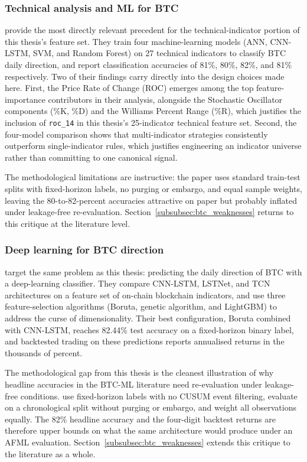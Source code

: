 \documentclass[12pt,a4paper,oneside]{article}
\begin{document}
\subsubsection{Technical analysis and ML for BTC}\label{subsubsec:btc_ta}

\citet{mate_confluence_2024} provide the most directly relevant precedent for the technical-indicator portion of this thesis's feature set. They train four machine-learning models (ANN, CNN-LSTM, SVM, and Random Forest) on 27 technical indicators to classify BTC daily direction, and report classification accuracies of 81\%, 80\%, 82\%, and 81\% respectively. Two of their findings carry directly into the design choices made here. First, the Price Rate of Change (ROC) emerges among the top feature-importance contributors in their analysis, alongside the Stochastic Oscillator components (\%K, \%D) and the Williams Percent Range (\%R), which justifies the inclusion of \texttt{roc\_14} in this thesis's 25-indicator technical feature set. Second, the four-model comparison shows that multi-indicator strategies consistently outperform single-indicator rules, which justifies engineering an indicator universe rather than committing to one canonical signal.

The methodological limitations are instructive: the paper uses standard train-test splits with fixed-horizon labels, no purging or embargo, and equal sample weights, leaving the 80-to-82-percent accuracies attractive on paper but probably inflated under leakage-free re-evaluation. Section~\ref{subsubsec:btc_weaknesses} returns to this critique at the literature level.


\subsubsection{Deep learning for BTC direction}\label{subsubsec:btc_dl}

\citet{omole_enke_2024} target the same problem as this thesis: predicting the daily direction of BTC with a deep-learning classifier. They compare CNN-LSTM, LSTNet, and TCN architectures on a feature set of on-chain blockchain indicators, and use three feature-selection algorithms (Boruta, genetic algorithm, and LightGBM) to address the curse of dimensionality. Their best configuration, Boruta combined with CNN-LSTM, reaches 82.44\% test accuracy on a fixed-horizon binary label, and backtested trading on these predictions reports annualised returns in the thousands of percent.

The methodological gap from this thesis is the cleanest illustration of why headline accuracies in the BTC-ML literature need re-evaluation under leakage-free conditions. \citet{omole_enke_2024} use fixed-horizon labels with no CUSUM event filtering, evaluate on a chronological split without purging or embargo, and weight all observations equally. The 82\% headline accuracy and the four-digit backtest returns are therefore upper bounds on what the same architecture would produce under an AFML evaluation. Section~\ref{subsubsec:btc_weaknesses} extends this critique to the literature as a whole.
\end{document}
